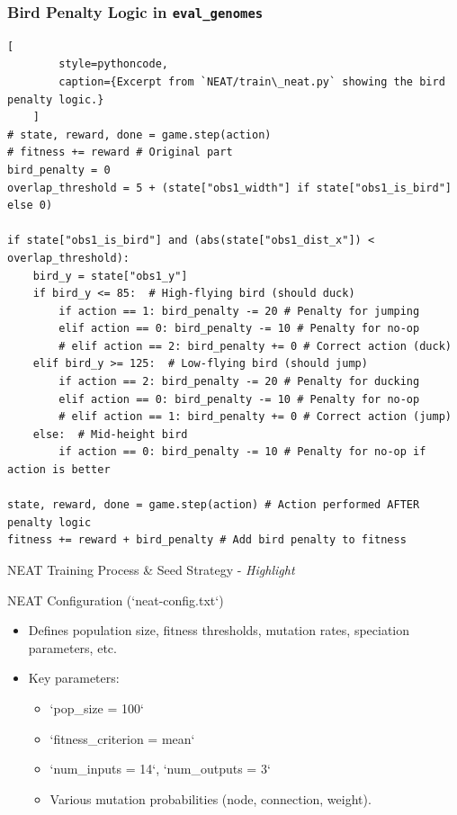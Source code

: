\documentclass{beamer}
\begin{document}
\begin{frame}[fragile] %
    \frametitle{Bird Penalty Logic in \texttt{eval\_genomes}}
    \begin{lstlisting}[
        style=pythoncode,
        caption={Excerpt from `NEAT/train\_neat.py` showing the bird penalty logic.}
    ]
# state, reward, done = game.step(action)
# fitness += reward # Original part
bird_penalty = 0
overlap_threshold = 5 + (state["obs1_width"] if state["obs1_is_bird"] else 0)

if state["obs1_is_bird"] and (abs(state["obs1_dist_x"]) < overlap_threshold):
    bird_y = state["obs1_y"]
    if bird_y <= 85:  # High-flying bird (should duck)
        if action == 1: bird_penalty -= 20 # Penalty for jumping
        elif action == 0: bird_penalty -= 10 # Penalty for no-op
        # elif action == 2: bird_penalty += 0 # Correct action (duck)
    elif bird_y >= 125:  # Low-flying bird (should jump)
        if action == 2: bird_penalty -= 20 # Penalty for ducking
        elif action == 0: bird_penalty -= 10 # Penalty for no-op
        # elif action == 1: bird_penalty += 0 # Correct action (jump)
    else:  # Mid-height bird
        if action == 0: bird_penalty -= 10 # Penalty for no-op if action is better

state, reward, done = game.step(action) # Action performed AFTER penalty logic
fitness += reward + bird_penalty # Add bird penalty to fitness
    \end{lstlisting}
\end{frame}

\begin{frame}{NEAT Training Process \& Seed Strategy - \textit{Highlight}}
  \begin{block}{NEAT Configuration (`neat-config.txt`)}
    \begin{itemize}
        \item Defines population size, fitness thresholds, mutation rates, speciation parameters, etc.
        \item Key parameters:
            \begin{itemize}
                \item `pop\_size = 100`
                \item `fitness\_criterion = mean`
                \item `num\_inputs = 14`, `num\_outputs = 3`
                \item Various mutation probabilities (node, connection, weight).
            \end{itemize}
    \end{itemize}
  \end{block}
\end{frame}
\end{document}
